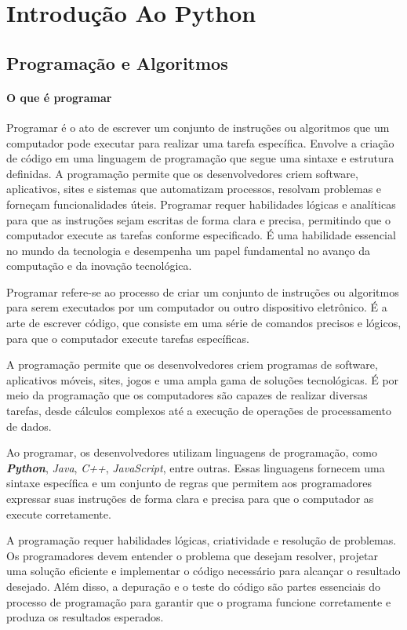 \documentclass[a4paper, 12pt, onecolumn,singlespacing]{article}
\begin{document}
	\section{Introdução Ao Python}
	\label{intro_python}
	\subsection{Programação e Algoritmos}
	\label{programacao_e_algoritmos}
	
	\paragraph{O que é programar} \label{o_que_e_programar} Programar é o ato de escrever um conjunto de instruções ou algoritmos que um computador pode executar para realizar uma tarefa específica. Envolve a criação de código em uma linguagem de programação que segue uma sintaxe e estrutura definidas. A programação permite que os desenvolvedores criem software, aplicativos, sites e sistemas que automatizam processos, resolvam problemas e forneçam funcionalidades úteis. Programar requer habilidades lógicas e analíticas para que as instruções sejam escritas de forma clara e precisa, permitindo que o computador execute as tarefas conforme especificado. É uma habilidade essencial no mundo da tecnologia e desempenha um papel fundamental no avanço da computação e da inovação tecnológica.
	
	Programar refere-se ao processo de criar um conjunto de instruções ou algoritmos para serem executados por um computador ou outro dispositivo eletrônico. É a arte de escrever código, que consiste em uma série de comandos precisos e lógicos, para que o computador execute tarefas específicas.
	
	A programação permite que os desenvolvedores criem programas de software, aplicativos móveis, sites, jogos e uma ampla gama de soluções tecnológicas. É por meio da programação que os computadores são capazes de realizar diversas tarefas, desde cálculos complexos até a execução de operações de processamento de dados.
	
	Ao programar, os desenvolvedores utilizam linguagens de programação, como \textbf{\textit{Python}}, \textit{Java}, \textit{C++}, \textit{JavaScript}, entre outras. Essas linguagens fornecem uma sintaxe específica e um conjunto de regras que permitem aos programadores expressar suas instruções de forma clara e precisa para que o computador as execute corretamente.
	
	A programação requer habilidades lógicas, criatividade e resolução de problemas. Os programadores devem entender o problema que desejam resolver, projetar uma solução eficiente e implementar o código necessário para alcançar o resultado desejado. Além disso, a depuração e o teste do código são partes essenciais do processo de programação para garantir que o programa funcione corretamente e produza os resultados esperados.
	
\end{document}
